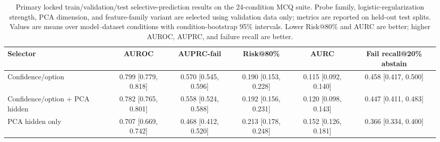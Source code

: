 
\begin{table}[t]
\centering
\small
\caption{Primary locked train/validation/test selective-prediction results on the 24-condition MCQ suite. Probe family, logistic-regularization strength, PCA dimension, and feature-family variant are selected using validation data only; metrics are reported on held-out test splits. Values are means over model--dataset conditions with condition-bootstrap 95\% intervals. Lower Risk@80\% and AURC are better; higher AUROC, AUPRC, and failure recall are better.}
\label{tab:locked-primary}
\begin{adjustbox}{width=\textwidth}
\begin{tabular}{lccccc}
\toprule
Selector & AUROC & AUPRC-fail & Risk@80\% & AURC & Fail recall@20\% abstain \\
\midrule
Confidence/option & 0.799 [0.779, 0.818] & 0.570 [0.545, 0.596] & 0.190 [0.153, 0.228] & 0.115 [0.092, 0.140] & 0.458 [0.417, 0.500] \\
Confidence/option + PCA hidden & 0.782 [0.765, 0.801] & 0.558 [0.524, 0.588] & 0.192 [0.156, 0.231] & 0.120 [0.098, 0.143] & 0.447 [0.411, 0.483] \\
PCA hidden only & 0.707 [0.669, 0.742] & 0.468 [0.412, 0.520] & 0.213 [0.178, 0.248] & 0.152 [0.126, 0.181] & 0.366 [0.334, 0.400] \\
\bottomrule
\end{tabular}
\end{adjustbox}
\end{table}
